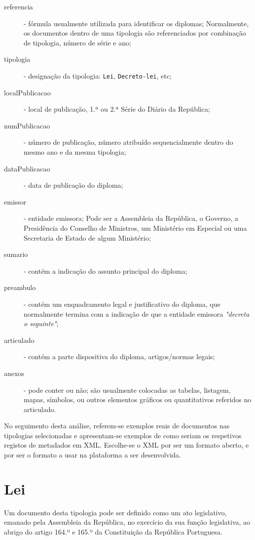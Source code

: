\begin{description}
    \item[referencia] - fórmula usualmente utilizada para identificar os diplomas; 
    Normalmente, os documentos dentro de uma tipologia 
    são referenciados por combinação de tipologia, número de série e ano;
    \item[tipologia] - designação da tipologia: \texttt{Lei}, \texttt{Decreto-lei}, etc;
    \item[localPublicacao] - local de publicação, 1.ª ou 2.ª Série do 
    Diário da República;
    \item[numPublicacao] - número de publicação, número atribuído sequencialmente 
    dentro do mesmo ano e da mesma tipologia;
    \item[dataPublicacao] - data de publicação do diploma;
    \item[emissor] - entidade emissora; Pode ser a Assembleia da República, o Governo, 
    a Presidência do Conselho de Ministros, um Ministério em Especial ou uma Secretaria 
    de Estado de algum Ministério;
    \item[sumario] - contém a indicação do assunto principal do diploma;
    \item[preambulo] - contém um enquadramento legal e justificativo do diploma, 
    que normalmente termina com a indicação de que a entidade emissora \emph{"decreta o seguinte"};
    \item[articulado] - contém a parte dispositiva do diploma, artigos/normas legais;
    \item[anexos] - pode conter ou não; são usualmente colocadas as tabelas, listagem, mapas, símbolos, 
    ou outros elementos gráficos ou quantitativos referidos no articulado.
\end{description}

No seguimento desta análise, referem-se exemplos reais de documentos nas tipologias selecionadas e apresentam-se 
exemplos de como seriam os respetivos registos de metadados em XML. Escolhe-se o XML por ser um formato aberto,
e por ser o formato a usar na plataforma a ser desenvolvida.

\section{Lei}

Um documento desta tipologia pode ser definido como um ato legislativo, emanado pela Assembleia da República, 
no exercício da sua função legislativa, ao abrigo do artigo 164.º e 165.º da Constituição da República Portuguesa.

